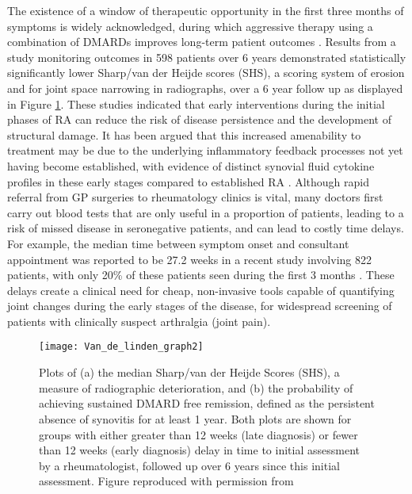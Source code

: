 \documentclass[twoside]{bhamthesis}
\theoremstyle{definition}
\begin{document}
The existence of a window of therapeutic opportunity \cite{nell2004benefit} in the first three months of symptoms is widely acknowledged, during which aggressive therapy using a combination of DMARDs improves long-term patient outcomes \cite{landewe2002cobra}. Results from a study monitoring outcomes in 598 patients over 6 years \cite{van2010long} demonstrated statistically significantly lower Sharp/van der Heijde scores (SHS), a scoring system of erosion and for joint space narrowing in radiographs, over a 6 year follow up as displayed in Figure \ref{fig:Van_de_linden_graph2}. These studies indicated that early interventions during the initial phases of RA can reduce the risk of disease persistence and the development of structural damage. It has been argued that this increased amenability to treatment may be due to the underlying inflammatory feedback processes not yet having become established, with evidence of distinct synovial fluid cytokine profiles in these early stages compared to established RA \cite{raza2005early}. Although rapid referral from GP surgeries to rheumatology clinics is vital, many doctors first carry out blood tests that are only useful in a proportion of patients, leading to a risk of missed disease in seronegative patients, and can lead to costly time delays. For example, the median time between symptom onset and consultant appointment was reported to be 27.2 weeks in a recent study involving 822 patients, with only 20\% of these patients seen during the first 3 months \cite{stack2019delays}. These delays create a clinical need for cheap, non-invasive tools capable of quantifying joint changes during the early stages of the disease, for widespread screening of patients with clinically suspect arthralgia (joint pain).

\begin{figure}[!ht]
\centering\texttt{[image: Van\_de\_linden\_graph2]}
\caption[Plots of (a) the median Sharp/van der Heijde Scores (SHS), a measure of radiographic deterioration, and (b) the probability of achieving sustained DMARD free remission, defined as the persistent absence of synovitis for at least 1 year. Both plots are shown for groups with either greater than 12 weeks (late diagnosis) or fewer than 12 weeks (early diagnosis) delay in time to initial assessment by a rheumatologist, followed up over 6 years since this initial assessment.]{Plots of (a) the median Sharp/van der Heijde Scores (SHS), a measure of radiographic deterioration, and (b) the probability of achieving sustained DMARD free remission, defined as the persistent absence of synovitis for at least 1 year. Both plots are shown for groups with either greater than 12 weeks (late diagnosis) or fewer than 12 weeks (early diagnosis) delay in time to initial assessment by a rheumatologist, followed up over 6 years since this initial assessment. Figure reproduced with permission from \cite{van2010long}}
 \label{fig:Van_de_linden_graph2}
\end{figure}
\end{document}
